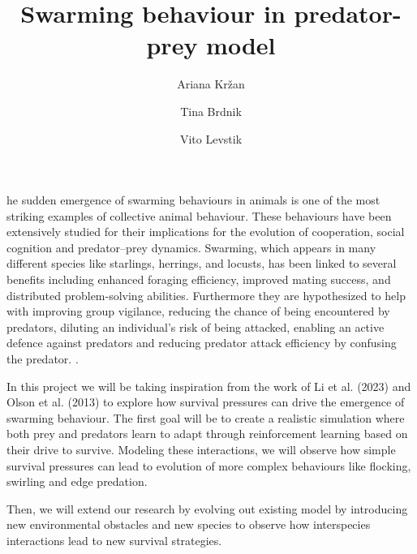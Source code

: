 \documentclass[9pt]{pnas-new}
\title{Swarming behaviour in predator-prey model}
\author{Ariana Kržan}
\author{Tina Brdnik}
\author{Vito Levstik}
\affil{Collective behaviour course research seminar report}
\begin{document}
\verticaladjustment{-2pt}

\maketitle
\thispagestyle{firststyle}

he sudden emergence of swarming behaviours in animals is one of the most striking examples of collective animal behaviour. 
These behaviours have been extensively studied for their implications for the evolution of cooperation, 
social cognition and predator–prey dynamics\cite{olson2013predator}. Swarming, which appears in many different species like starlings, 
herrings, and locusts, has been linked to several benefits including enhanced foraging efficiency, improved mating success, and distributed problem-solving abilities. 
Furthermore they are hypothesized to help with improving group vigilance, reducing the chance of being encountered by predators, 
diluting an individual's risk of being attacked, enabling an active defence against predators and reducing predator attack efficiency by confusing the predator. \cite{li2023predator}.

In this project we will be taking inspiration from the work of Li et al. (2023) and Olson et al. (2013) to explore how survival pressures can drive the emergence of swarming behaviour. 
The first goal will be to create a realistic simulation where both prey and predators learn to adapt through reinforcement learning based on their drive to survive.
Modeling these interactions, we will observe how simple survival pressures can lead to evolution of more complex behaviours like flocking, swirling and edge predation. 

Then, we will extend our research by evolving out existing model by introducing new environmental obstacles and new species to observe how interspecies interactions lead to new survival strategies.
\end{document}
